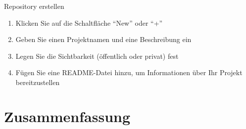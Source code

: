 \documentclass[compress,aspectratio=169]{beamer}
\begin{document}
	\begin{frame}{Repository erstellen}
		\begin{enumerate}
			\item Klicken Sie auf die Schaltfläche ``New'' oder ``+''
			\item Geben Sie einen Projektnamen und eine Beschreibung ein
			\item Legen Sie die Sichtbarkeit (öffentlich oder privat) fest
			\item Fügen Sie eine README-Datei hinzu, um Informationen über Ihr Projekt bereitzustellen
		\end{enumerate}
	\end{frame}


	\section{Zusammenfassung}
\end{document}

